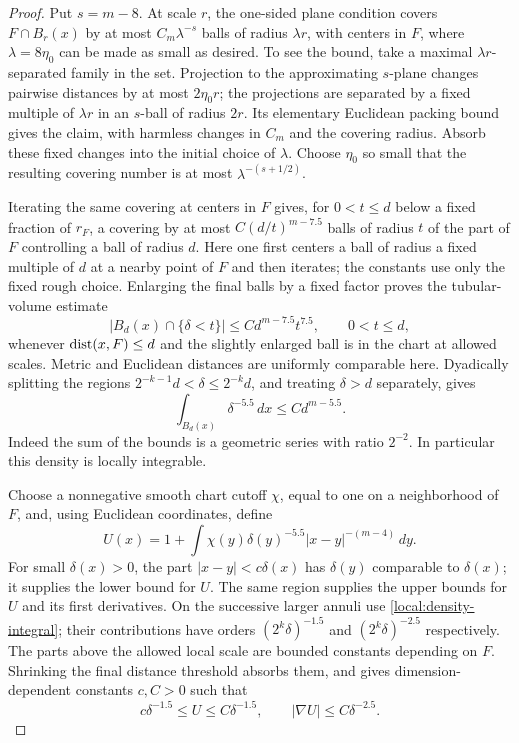 \begin{proof}
Put $s=m-8$.  At scale $r$, the one-sided plane condition covers
$F\cap B_r(x)$ by at most $C_m\lambda^{-s}$ balls of radius
$\lambda r$, with centers in $F$, where $\lambda=8\eta_0$ can be
made as small as desired.  To see the bound, take a maximal
$\lambda r$-separated family in the set.  Projection to the
approximating $s$-plane changes pairwise distances by at most
$2\eta_0r$; the projections are separated by a fixed multiple of
$\lambda r$ in an $s$-ball of radius $2r$.  Its elementary Euclidean
packing bound gives the claim, with harmless changes in $C_m$ and
the covering radius.  Absorb these fixed changes into the initial
choice of $\lambda$.  Choose $\eta_0$ so small that the resulting
covering number is at most $\lambda^{-(s+1/2)}$.

Iterating the same covering at centers in $F$ gives, for $0<t\le d$
below a fixed fraction of $r_F$, a covering by at most
$C(d/t)^{m-7.5}$ balls of radius $t$ of the part of $F$ controlling a
ball of radius $d$.  Here one first centers a ball of radius a fixed
multiple of $d$ at a nearby point of $F$ and then iterates; the
constants use only the fixed rough choice.  Enlarging the final
balls by a fixed factor proves the tubular-volume estimate
\begin{equation}\label{local:tube-volume}
 |B_d(x)\cap\{\delta<t\}|
       \le C d^{m-7.5}t^{7.5},\qquad 0<t\le d,
\end{equation}
whenever $\operatorname{dist}(x,F)\le d$ and the slightly enlarged ball is in the
chart at allowed scales.  Metric and Euclidean distances are
uniformly comparable here.  Dyadically splitting the regions
$2^{-k-1}d<\delta\le2^{-k}d$, and treating $\delta>d$ separately,
gives
\begin{equation}\label{local:density-integral}
 \int_{B_d(x)}\delta^{-5.5}\,dx\le C d^{m-5.5}.
\end{equation}
Indeed the sum of the bounds is a geometric series with ratio
$2^{-2}$.  In particular this density is locally integrable.

Choose a nonnegative smooth chart cutoff $\chi$, equal to one on a
neighborhood of $F$, and, using Euclidean coordinates, define
\begin{equation}\label{local:rough-potential}
 U(x)=1+\int\chi(y)\delta(y)^{-5.5}|x-y|^{-(m-4)}\,dy.
\end{equation}
For small $\delta(x)>0$, the part $|x-y|<c\delta(x)$ has
$\delta(y)$ comparable to $\delta(x)$; it supplies the lower bound
for $U$.  The same region supplies the upper bounds for $U$ and its
first derivatives.  On the successive larger annuli use
\eqref{local:density-integral}; their contributions have orders
$(2^k\delta)^{-1.5}$ and $(2^k\delta)^{-2.5}$ respectively.
The parts above the allowed local scale are bounded constants
depending on $F$.  Shrinking the final distance threshold absorbs
them, and gives dimension-dependent constants $c,C>0$ such that
\begin{equation}\label{local:rough-U-bounds}
 c\delta^{-1.5}\le U\le C\delta^{-1.5},
 \qquad |\nabla U|\le C\delta^{-2.5}.
\end{equation}


\end{proof}
